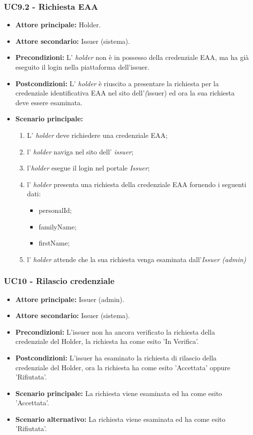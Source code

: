 \subsubsection{UC9.2 - Richiesta EAA}
\begin{itemize}
\item \textbf{Attore principale:} Holder.
\item \textbf{Attore secondario:} Issuer (sistema).
\item \textbf{Precondizioni:} L’ \textit{holder} non è in possesso della credenziale EAA, ma ha già eseguito il login nella piattaforma dell'issuer.
\item \textbf{Postcondizioni:} L’ \textit{holder} è riuscito a presentare la richiesta per la credenziale identificativa EAA nel sito dell'\textit(issuer) ed ora la sua richiesta deve essere esaminata.
\item \textbf{Scenario principale:} 
    \begin{enumerate}
        \item L' \textit{holder} deve richiedere una credenziale EAA; 
        \item l' \textit{holder} naviga nel sito dell' \textit{issuer};
        \item l'\textit{holder} esegue il login nel portale \textit{Issuer};
        \item l' \textit{holder} presenta una richiesta della credenziale EAA fornendo i seguenti dati:
        \begin{itemize}
            \item personalId;
            \item familyName;
            \item firstName;
        \end{itemize}
        \item l' \textit{holder} attende che la sua richiesta venga esaminata dall'\textit{Issuer (admin)}
    \end{enumerate}
\end{itemize}

\subsubsection{UC10 - Rilascio credenziale}
\begin{itemize}
    \item \textbf{Attore principale:} Issuer (admin).
    \item \textbf{Attore secondario:} Issuer (sistema).
    \item \textbf{Precondizioni:} L'issuer non ha ancora verificato la richiesta della credenziale del Holder, la richiesta ha come esito 'In Verifica'.
    \item \textbf{Postcondizioni:} L'issuer ha esaminato la richiesta di rilascio della credenziale del Holder, ora la richiesta ha come esito 'Accettata' oppure 'Rifiutata'.
    \item \textbf{Scenario principale:} La richiesta viene esaminata ed ha come esito 'Accettata'.
    \item \textbf{Scenario alternativo:} La richiesta viene esaminata ed ha come esito 'Rifiutata'.
\end{itemize}

